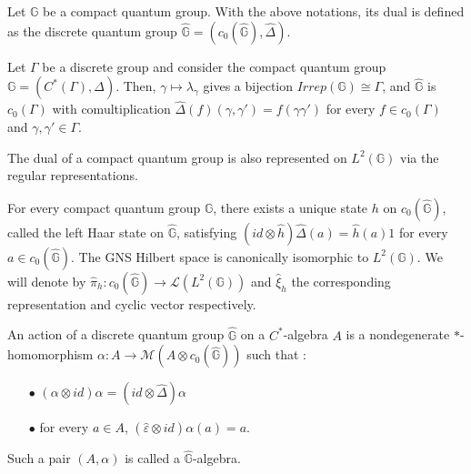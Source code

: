 \begin{definition}
Let $\mathbb G$ be a compact quantum group. With the above notations, its dual is defined as the discrete quantum group $\hat{\mathbb G} = (c_0(\hat{\mathbb G}),\hat\Delta)$.
\end{definition}

\begin{Expl} Let $\Gamma$ be a discrete group and consider the compact quantum group $\mathbb G=(C^*(\Gamma),\Delta)$. Then, $\gamma\mapsto \lambda_\gamma$ gives a bijection $Irrep(\mathbb G)\cong \Gamma$, and $\hat{\mathbb G}$ is $c_0(\Gamma)$ with comultiplication $\hat\Delta (f)(\gamma,\gamma') = f(\gamma\gamma')$ for every $f\in c_0(\Gamma)$ and $\gamma,\gamma'\in\Gamma$.
\end{Expl}

The dual of a compact quantum group is also represented on $L^2(\mathbb G)$ via the regular representations. 
\begin{prop}
For every compact quantum group $\mathbb G$, there exists a unique state $h$ on $c_0(\hat{\mathbb G})$, called the left Haar state on $\hat{\mathbb G}$, satisfying $(id\otimes \hat h)\hat\Delta(a) = \hat h(a)1 $ for every $a\in c_0(\hat{\mathbb G})$. The GNS Hilbert space is canonically isomorphic to $L^2(\mathbb G)$. We will denote by $\hat \pi_h : c_0(\hat{\mathbb G})\rightarrow \mathcal L(L^2(\mathbb G))$ and $\hat \xi_h$ the corresponding representation and cyclic vector respectively.  
\end{prop}


\begin{definition} An action of a discrete quantum group $\hat{\mathbb G}$ on a $C^*$-algebra $A$ is a nondegenerate $*$-homomorphism $\alpha : A\rightarrow \mathcal M(A\otimes c_0(\hat{\mathbb G}))$ such that :
\begin{itemize}
\item[$\bullet$] $(\alpha \otimes id )\alpha = (id\otimes \hat\Delta) \alpha$
\item[$\bullet$] for every $a\in A$, $(\hat\varepsilon \otimes id)\alpha(a) = a$.
\end{itemize}
Such a pair $(A,\alpha)$ is called a $\hat{\mathbb G}$-algebra.
\end{definition}

